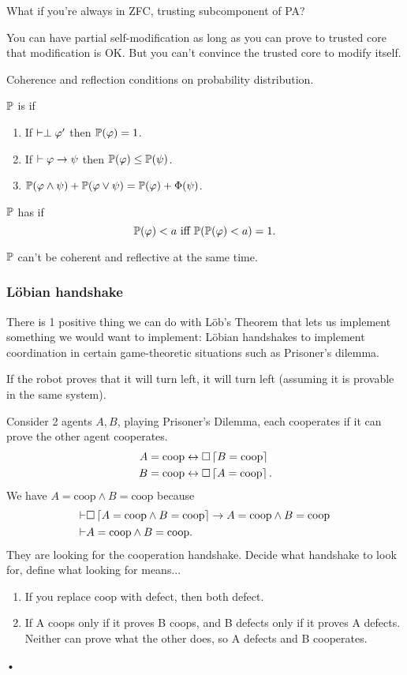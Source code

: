 \documentclass[11pt]{article}
\begin{document}

What if you're always in ZFC, trusting subcomponent of PA?

You can have partial self-modification as long as you can prove to trusted core that modification is OK. But you can't convince the trusted core to modify itself.

Coherence and reflection conditions on probability distribution.
\begin{df}
$\mathbb{P}$ is  if
\begin{enumerate}
\item
If $\vdash \perp \varphi'$ then $\mathbb{P}(\varphi)=1$. 
\item
If $\vdash \varphi\to \psi$ then $\mathbb{P}(\varphi) \le \mathbb{P}(\psi)$. 
\item
$\mathbb{P}(\varphi\wedge \psi)+ \mathbb{P}(\varphi\vee \psi) =\mathbb{P}(\varphi) + \Phi(\psi)$.
\end{enumerate}
$\mathbb{P}$ has  if
$$
\mathbb{P}(\varphi)<a \text{ iff } \mathbb{P}(\mathbb{P}(\varphi)<a)=1.
$$
\end{df}
$\mathbb{P}$ can't be coherent and reflective at the same time.

\subsubsection{L\"obian handshake}
There is 1 positive thing we can do with L\"ob's Theorem that lets us implement something we would want to implement: L\"obian handshakes to implement coordination in certain game-theoretic situations such as Prisoner's dilemma.

If the robot proves that it will turn left, it will turn left (assuming it is provable in the same system).

Consider 2 agents $A, B$, playing Prisoner's Dilemma, each cooperates if it can prove the other agent cooperates.
\begin{align}
A&=\text{coop} \leftrightarrow \square \left\lceil {B=\text{coop}}\right\rceil\\
B&=\text{coop} \leftrightarrow  \square \left\lceil {A=\text{coop}}\right\rceil.
\end{align}
We have $A=\text{coop}\wedge B=\text{coop} $ because
\begin{align}
\vdash& \square 
\left\lceil {A=\text{coop} \wedge B=\text{coop}}\right\rceil \to 
A=\text{coop}\wedge B=\text{coop}\\
\vdash &A=\text{coop}\wedge B= \text{coop}.
\end{align}
They are looking for the cooperation handshake. Decide what handshake to look for, define what looking for means...
\begin{enumerate}
\item
If you replace coop with defect, then both defect.
\item
If A coops only if it proves B coops, and B defects only if it proves A defects. Neither can prove what the other does, so A defects and B cooperates.
\end{enumerate}•





\end{document}
